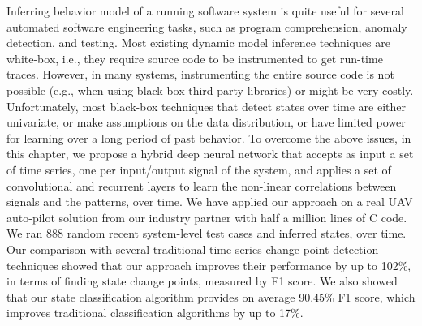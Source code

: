 Inferring behavior model of a running software system is quite useful for several automated software engineering tasks, such as program comprehension, anomaly detection, and testing. Most existing dynamic model inference techniques are white-box, i.e., they require source code to be instrumented to get run-time traces. However, in many systems, instrumenting the entire source code is not possible (e.g., when using black-box third-party libraries) or might be very costly. %
Unfortunately, most black-box techniques that detect states over time are either univariate, or make assumptions on the data distribution, or have limited power for learning over a long period of past behavior. To overcome the above issues, in this chapter, we propose a hybrid deep neural network that accepts as input a set of time series, one per input/output signal of the system, and applies a set of convolutional and recurrent layers to learn the non-linear correlations between signals and the patterns, over time. We have applied our approach on a real UAV auto-pilot solution from our industry partner with half a million lines of C code. We ran 888 random recent system-level test cases and inferred states, over time. Our comparison with several traditional time series change point detection techniques showed that our approach improves their performance by up to 102\%, in terms of finding state change points, measured by F1 score. We also showed that our state classification algorithm provides on average 90.45\% F1 score, which improves traditional classification algorithms by up to 17\%.
